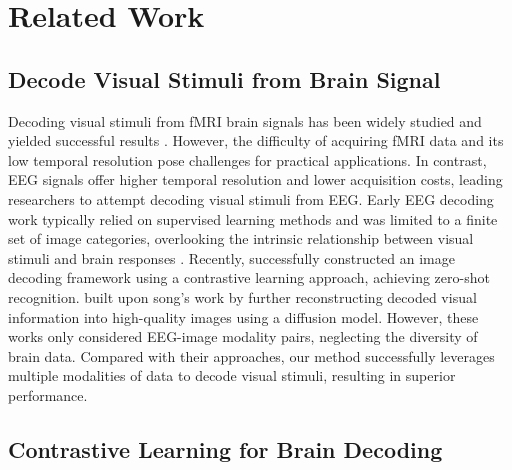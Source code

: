 \documentclass[letterpaper]{article} %
\begin{document}
\section{Related Work}

\subsection{Decode Visual Stimuli from Brain Signal}

Decoding visual stimuli from fMRI brain signals has been widely studied and yielded successful results \cite{gu2024decoding, Takagi_2023_CVPR, scotti2024reconstructing, miyawaki2008visual, kay2008identifying}. However, the difficulty of acquiring fMRI data and its low temporal resolution pose challenges for practical applications. In contrast,  EEG signals offer higher temporal resolution and lower acquisition costs, leading researchers to attempt decoding visual stimuli from EEG. Early EEG decoding work typically relied on supervised learning methods and was limited to a finite set of image categories, overlooking the intrinsic relationship between visual stimuli and brain responses \cite{li2020perils, liu2023brain}
. Recently, \cite{song2024decoding, scotti2024reconstructing} successfully constructed an image decoding framework using a contrastive learning approach, achieving zero-shot recognition. \cite{li2024visualdecodingreconstructioneeg} built upon song's work \cite{song2024decoding} by further reconstructing decoded visual information into high-quality images using a diffusion model. However, these works only considered EEG-image modality pairs, neglecting the diversity of brain data. Compared with their approaches, our method successfully leverages multiple modalities of data to decode visual stimuli, resulting in superior performance.

\subsection{Contrastive Learning for Brain Decoding}
\end{document}
